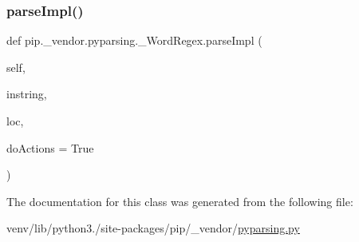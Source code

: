 \subsubsection{\texorpdfstring{parse\+Impl()}{parseImpl()}}
{\footnotesize\ttfamily def pip.\+\_\+vendor.\+pyparsing.\+\_\+\+Word\+Regex.\+parse\+Impl (\begin{DoxyParamCaption}\item[{}]{self,  }\item[{}]{instring,  }\item[{}]{loc,  }\item[{}]{do\+Actions = {\ttfamily True} }\end{DoxyParamCaption})}



The documentation for this class was generated from the following file\+:\begin{DoxyCompactItemize}
\item 
venv/lib/python3./site-\/packages/pip/\+\_\+vendor/\hyperlink{pip_2__vendor_2pyparsing_8py}{pyparsing.\+py}\end{DoxyCompactItemize}
